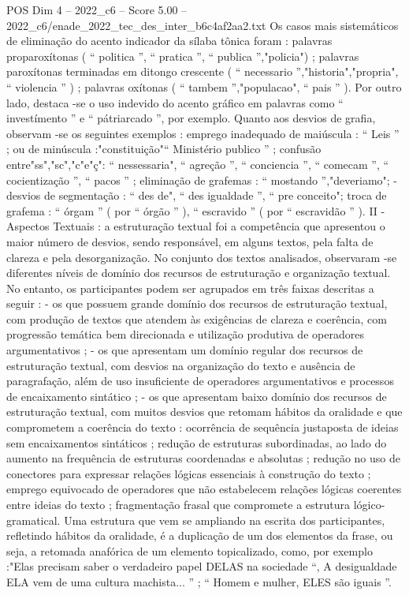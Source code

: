 \begin{textsample}{POS Dim 4 – 2022\_c6 – Score 5.00 – 2022\_c6/enade\_2022\_tec\_des\_inter\_b6c4af2aa2.txt}
Os casos mais sistemáticos de eliminação do acento indicador da sílaba tônica foram : palavras proparoxítonas ( “ politica ”, “ pratica ”, “ publica ”,"policia") ; palavras paroxítonas terminadas em ditongo crescente ( “ necessario ”,"historia","propria", “ violencia ” ) ; palavras oxítonas ( “ tambem ”,"populacao", “ pais ” ).
Por outro lado, destaca -se o uso indevido do acento gráfico em palavras como “ investímento ” e “ pátriarcado ”, por exemplo.
Quanto aos desvios de grafia, observam -se os seguintes exemplos : emprego inadequado de maiúscula : “ Leis ” ; ou de minúscula :"constituição"“ Ministério publico ” ; confusão entre"ss","sc","c"e"ç": “ nessessaria", “ agreção ”, “ conciencia ”, “ comecam ”, “ cocientização ”, “ pacos ” ; eliminação de grafemas : “ mostando ”,"deveriamo"; - desvios de segmentação : “ des de", “ des igualdade ”, “ pre conceito"; troca de grafema : “ órgam ” ( por “ órgão ” ), “ escravido ” ( por “ escravidão ” ).
II - Aspectos Textuais : a estruturação textual foi a competência que apresentou o maior número de desvios, sendo responsável, em alguns textos, pela falta de clareza e pela desorganização.
No conjunto dos textos analisados, observaram -se diferentes níveis de domínio dos recursos de estruturação e organização textual.
No entanto, os participantes podem ser agrupados em três faixas descritas a seguir : - os que possuem grande domínio dos recursos de estruturação textual, com produção de textos que atendem às exigências de clareza e coerência, com progressão temática bem direcionada e utilização produtiva de operadores argumentativos ; - os que apresentam um domínio regular dos recursos de estruturação textual, com desvios na organização do texto e ausência de paragrafação, além de uso insuficiente de operadores argumentativos e processos de encaixamento sintático ; - os que apresentam baixo domínio dos recursos de estruturação textual, com muitos desvios que retomam hábitos da oralidade e que comprometem a coerência do texto : ocorrência de sequência justaposta de ideias sem encaixamentos sintáticos ; redução de estruturas subordinadas, ao lado do aumento na frequência de estruturas coordenadas e absolutas ; redução no uso de conectores para expressar relações lógicas essenciais à construção do texto ; emprego equivocado de operadores que não estabelecem relações lógicas coerentes entre ideias do texto ; fragmentação frasal que compromete a estrutura lógico-gramatical.
Uma estrutura que vem se ampliando na escrita dos participantes, refletindo hábitos da oralidade, é a duplicação de um dos elementos da frase, ou seja, a retomada anafórica de um elemento topicalizado, como, por exemplo :"Elas precisam saber o verdadeiro papel DELAS na sociedade “, A desigualdade ELA vem de uma cultura machista... ” ; “ Homem e mulher, ELES são iguais ”.

\end{textsample}
